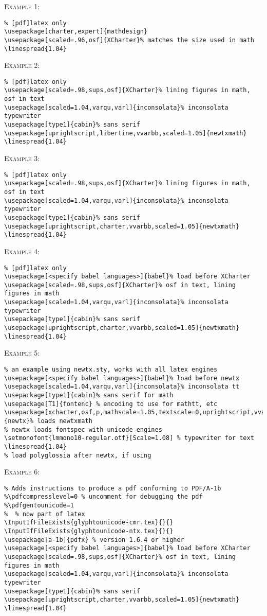 \documentclass[11pt]{article}
\begin{document}
\textsc{Example 1:}
\begin{verbatim}
% [pdf]latex only
\usepackage[charter,expert]{mathdesign}
\usepackage[scaled=.96,osf]{XCharter}% matches the size used in math
\linespread{1.04}
\end{verbatim}

\textsc{Example 2:}
\begin{verbatim}
% [pdf]latex only
\usepackage[scaled=.98,sups,osf]{XCharter}% lining figures in math, osf in text
\usepackage[scaled=1.04,varqu,varl]{inconsolata}% inconsolata typewriter
\usepackage[type1]{cabin}% sans serif
\usepackage[uprightscript,libertine,vvarbb,scaled=1.05]{newtxmath}
\linespread{1.04}
\end{verbatim}

\textsc{Example 3:}
\begin{verbatim}
% [pdf]latex only
\usepackage[scaled=.98,sups,osf]{XCharter}% lining figures in math, osf in text
\usepackage[scaled=1.04,varqu,varl]{inconsolata}% inconsolata typewriter
\usepackage[type1]{cabin}% sans serif
\usepackage[uprightscript,charter,vvarbb,scaled=1.05]{newtxmath}
\linespread{1.04}
\end{verbatim}
\textsc{Example 4:}
\begin{verbatim}
% [pdf]latex only
\usepackage[<specify babel languages>]{babel}% load before XCharter
\usepackage[scaled=.98,sups,osf]{XCharter}% osf in text, lining figures in math
\usepackage[scaled=1.04,varqu,varl]{inconsolata}% inconsolata typewriter
\usepackage[type1]{cabin}% sans serif
\usepackage[uprightscript,charter,vvarbb,scaled=1.05]{newtxmath}
\linespread{1.04}
\end{verbatim}

\textsc{Example 5:}
\begin{verbatim}
% an example using newtx.sty, works with all latex engines
\usepackage[<specify babel languages>]{babel}% load before newtx
\usepackage[scaled=1.04,varqu,varl]{inconsolata}% inconsolata tt
\usepackage[type1]{cabin}% sans serif for math
\usepackage[T1]{fontenc} % encoding to use for mathtt, etc
\usepackage[xcharter,osf,p,mathscale=1.05,textscale=0,uprightscript,vvarbb]{newtx}% loads newtxmath
% newtx loads fontspec with unicode engines
\setmonofont{lmmono10-regular.otf}[Scale=1.08] % typewriter for text
\linespread{1.04}
% load polyglossia after newtx, if using
\end{verbatim}

\textsc{Example 6:}
\begin{verbatim}
% Adds instructions to produce a pdf conforming to PDF/A-1b
%\pdfcompresslevel=0 % uncomment for debugging the pdf
%\pdfgentounicode=1 
%  % now part of latex
\InputIfFileExists{glyphtounicode-cmr.tex}{}{} 
\InputIfFileExists{glyphtounicode-ntx.tex}{}{}
\usepackage[a-1b]{pdfx} % version 1.6.4 or higher
\usepackage[<specify babel languages>]{babel}% load before XCharter
\usepackage[scaled=.98,sups,osf]{XCharter}% osf in text, lining figures in math
\usepackage[scaled=1.04,varqu,varl]{inconsolata}% inconsolata typewriter
\usepackage[type1]{cabin}% sans serif
\usepackage[uprightscript,charter,vvarbb,scaled=1.05]{newtxmath}
\linespread{1.04}
\end{verbatim}
\end{document}
